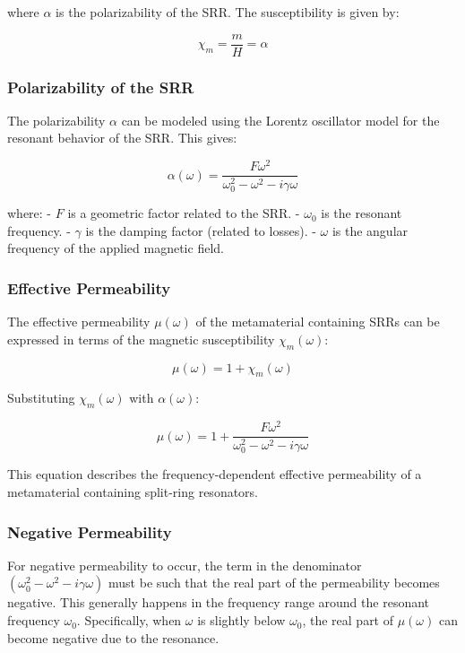 \documentclass[
  a4paper,
]{book}
\begin{document}
\begin{tcolorbox}
where \(\alpha\) is the polarizability of the SRR. The susceptibility is
given by:

\[ \chi_m = \frac{m}{H} = \alpha \]

\subsubsection{Polarizability of the
SRR}\label{polarizability-of-the-srr}

The polarizability \(\alpha\) can be modeled using the Lorentz
oscillator model for the resonant behavior of the SRR. This gives:

\[ \alpha(\omega) = \frac{F\omega^2}{\omega_0^2 - \omega^2 - i\gamma\omega} \]

where: - \(F\) is a geometric factor related to the SRR. - \(\omega_0\)
is the resonant frequency. - \(\gamma\) is the damping factor (related
to losses). - \(\omega\) is the angular frequency of the applied
magnetic field.

\subsubsection{Effective Permeability}\label{effective-permeability}

The effective permeability \(\mu(\omega)\) of the metamaterial
containing SRRs can be expressed in terms of the magnetic susceptibility
\(\chi_m(\omega)\):

\[ \mu(\omega) = 1 + \chi_m(\omega) \]

Substituting \(\chi_m(\omega)\) with \(\alpha(\omega)\):

\[ \mu(\omega) = 1 + \frac{F\omega^2}{\omega_0^2 - \omega^2 - i\gamma\omega} \]

This equation describes the frequency-dependent effective permeability
of a metamaterial containing split-ring resonators.

\subsubsection{Negative Permeability}\label{negative-permeability}

For negative permeability to occur, the term in the denominator
\((\omega_0^2 - \omega^2 - i\gamma\omega)\) must be such that the real
part of the permeability becomes negative. This generally happens in the
frequency range around the resonant frequency \(\omega_0\).
Specifically, when \(\omega\) is slightly below \(\omega_0\), the real
part of \(\mu(\omega)\) can become negative due to the resonance.


\end{tcolorbox}
\end{document}
